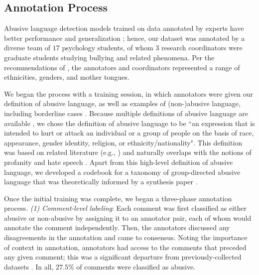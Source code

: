 \documentclass[letterpaper]{article} %
\begin{document}
\subsection{Annotation Process}

Abusive language detection models trained on data annotated by experts have better performance and generalization \cite{waseem2016you};
hence, our dataset was annotated by a diverse team of  $17$ psychology students, of whom $3$ research coordinators were graduate students studying bullying and related phenomena.
Per the recommendations of \cite{vidgen2019challenges}, the annotators and coordinators represented a range of ethnicities, genders, and mother tongues.

We began the process with a training session, in which annotators were given our definition of abusive language, as well as examples of (non-)abusive language, including borderline cases \cite{vidgen2019challenges}.
Because multiple definitions of abusive language are available \cite{fortuna2018survey,peter2018cyberbullying}, we chose the definition of abusive language to be ``an expression that is
intended to hurt or attack an individual or a group of people on the basis of race, appearance, gender identity, religion, or ethnicity/nationality".
This definition was based on related literature (e.g., \cite{nobata2016abusive}) and naturally overlaps with the notions of profanity and hate speech \cite{nockleby2000hate}.
Apart from this high-level definition of abusive language, we developed a  codebook for a taxonomy of group-directed abusive language that was theoretically informed by a synthesis paper \cite{patchin2015measuring}.

Once the initial training was complete, we began a three-phase annotation process.
\textit{(1) Comment-level labeling}: Each comment was first classified as either abusive or non-abusive by
assigning it to an annotator pair, each of whom would annotate the comment independently.
Then, the annotators discussed any disagreements in the annotation and came to consensus.
Noting the importance of context in annotation, annotators had access to the comments that preceded any given comment; this was a significant departure from previously-collected datasets \cite{vidgen2019challenges}.  In all, $27.5\%$ of comments were classified as abusive.
\end{document}
